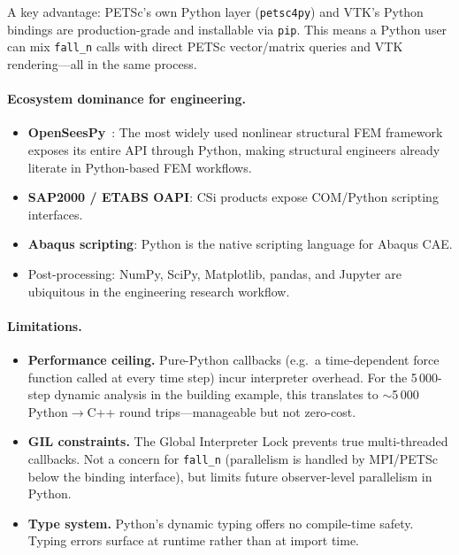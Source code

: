 A key advantage: PETSc's own Python layer (\texttt{petsc4py})
and VTK's Python bindings are production-grade and installable
via \texttt{pip}.  This means a Python user can mix
\texttt{fall\_n} calls with direct PETSc vector/matrix queries
and VTK rendering---all in the same process.

\paragraph{Ecosystem dominance for engineering.}
\begin{itemize}
  \item \textbf{OpenSeesPy}~\cite{OpenSees}: The most widely used
        nonlinear structural FEM framework exposes its entire API
        through Python, making structural engineers already literate
        in Python-based FEM workflows.
  \item \textbf{SAP2000 / ETABS OAPI}: CSi products expose COM/Python
        scripting interfaces.
  \item \textbf{Abaqus scripting}: Python is the native scripting
        language for Abaqus CAE.
  \item Post-processing: NumPy, SciPy, Matplotlib, pandas, and
        Jupyter are ubiquitous in the engineering research workflow.
\end{itemize}

\paragraph{Limitations.}
\begin{itemize}
  \item \textbf{Performance ceiling.}  Pure-Python callbacks
        (e.g.\ a time-dependent force function called at every time
        step) incur interpreter overhead.  For the 5\,000-step
        dynamic analysis in the building example, this translates
        to $\sim$5\,000 Python$\to$C++ round trips---manageable
        but not zero-cost.
  \item \textbf{GIL constraints.}  The Global Interpreter Lock
        prevents true multi-threaded callbacks.  Not a concern
        for \texttt{fall\_n} (parallelism is handled by MPI/PETSc
        below the binding interface), but limits future
        observer-level parallelism in Python.
  \item \textbf{Type system.}  Python's dynamic typing offers
        no compile-time safety.  Typing errors surface at runtime
        rather than at import time.
\end{itemize}

